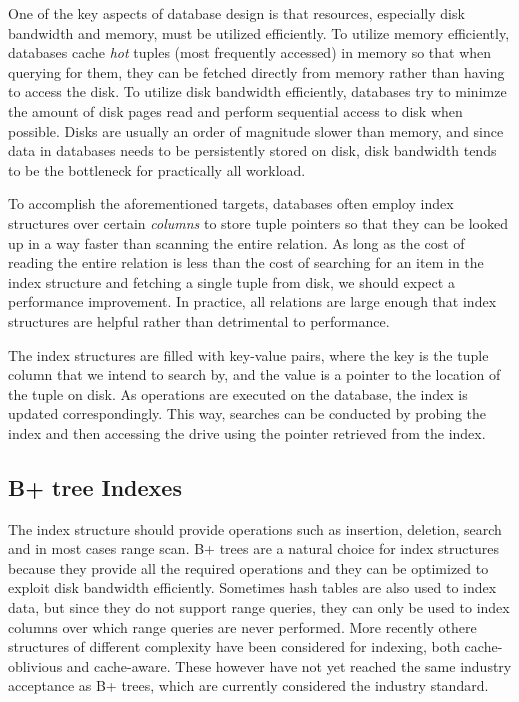 \documentclass{article}
\begin{document}
One of the key aspects of database design is that resources, especially disk
bandwidth and memory, must be utilized efficiently. To utilize memory
efficiently, databases cache \textit{hot} tuples (most frequently accessed) in
memory so that when querying for them, they can be fetched directly from memory
rather than having to access the disk. To utilize disk bandwidth efficiently,
databases try to minimze the amount of disk pages read and perform sequential
access to disk when possible. Disks are usually an order of magnitude slower
than memory, and since data in databases needs to be persistently stored on
disk, disk bandwidth tends to be the bottleneck for practically all workload.

To accomplish the aforementioned targets, databases often employ index
structures over certain \textit{columns} to store tuple pointers so that they
can be looked up in a way faster than scanning the entire relation. As long as
the cost of reading the entire relation is less than the cost of searching for
an item in the index structure and fetching a single tuple from disk, we should
expect a performance improvement. In practice, all relations are large enough
that index structures are helpful rather than detrimental to performance.

The index structures are filled with key-value pairs, where the key is the tuple
column that we intend to search by,
and the value is a pointer to the location of the tuple on disk.
As operations are executed on the database, the index is updated
correspondingly.
This way, searches can be conducted by probing the index and then accessing the
drive using the pointer retrieved from the index.


\subsection{B+ tree Indexes}
The index structure should provide operations such as insertion, deletion,
search and in most cases range scan. B+ trees are a natural choice for index
structures because they provide all the required operations and they can be
optimized to exploit disk bandwidth efficiently. Sometimes hash tables are also
used to index data, but since they do not support range queries, they can only
be used to index columns over which range queries are never performed.
More recently othere structures of different complexity have been considered for
indexing, both cache-oblivious and cache-aware.
These however have not yet reached the same industry acceptance as B+ trees,
which are currently considered the industry standard.
\end{document}
